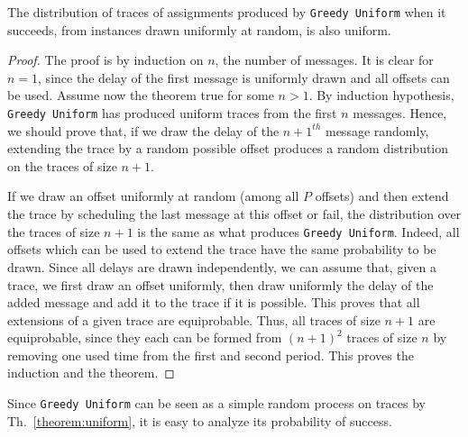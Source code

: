 \documentclass[a4paper,UKenglish,cleveref, autoref, thm-restate]{lipics-v2019}
\newcommand\greedyuniform{\texttt{Greedy Uniform}\xspace}
\begin{document}
\begin{theorem}\label{theorem:uniform}
The distribution of traces of assignments produced by \greedyuniform when it succeeds, from instances drawn uniformly at random, is also uniform.
\end{theorem}
\begin{proof}
The proof is by induction on $n$, the number of messages. It is clear for $n=1$,
since the delay of the first message is uniformly drawn and all offsets can be used.
Assume now the theorem true for some $n>1$. By induction hypothesis, \greedyuniform has produced
uniform traces from the first $n$ messages. Hence, we should prove that, if we draw the delay
of the $n+1^{th}$ message randomly, extending the trace by a random possible offset produces a random distribution on the traces of size $n+1$. 

 If we draw an offset uniformly at random (among all $P$ offsets) and then extend the trace by scheduling the last message at this offset or fail, the distribution over the traces of size $n+1$ is the same as what produces \greedyuniform. Indeed, all offsets which can be used to extend the trace have the same probability to be drawn. Since all delays are drawn independently, we can assume that, given a trace, we first draw an offset uniformly, then draw uniformly the delay of the added message and add it to the trace if it is possible. This proves that all extensions of a given trace are equiprobable. Thus, all traces of size $n+1$ are equiprobable, since they each can be formed from $(n+1)^2$ traces of size $n$ by removing one used time from the first and second period. This proves the induction and the theorem.
\end{proof}

Since \greedyuniform can be seen as a simple random process on traces by Th.~\ref{theorem:uniform}, it is easy to analyze its probability of success.
\end{document}

